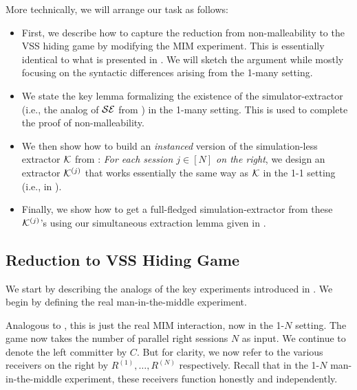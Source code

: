 More technically, we will arrange our task as follows:
\begin{itemize}
\item First, we describe how to capture the reduction from non-malleability to the VSS hiding game  by modifying the MIM experiment. This is essentially identical to what is presented in . We will sketch the argument while mostly focusing on the syntactic differences arising from the 1-many setting. 
\item 
We state the key lemma formalizing the existence of the simulator-extractor (i.e., the analog of $\mathcal{SE}$ from ) in the 1-many setting. This is used to complete the proof of non-malleability. 
\item 
We then show how to build an {\em instanced} version of the simulation-less extractor $\mathcal{K}$ from : {\em  For each session $j \in [N]$ on the right}, we design an extractor $\mathcal{K}^{(j)}$ that works essentially the same way as $\mathcal{K}$ in the 1-1 setting (i.e., in ). 
\item 
Finally, we show how to get a full-fledged simulation-extractor from these $\mathcal{K}^{(j)}$'s using our simultaneous extraction lemma given in . 
\end{itemize}  

\subsection{Reduction to VSS Hiding Game} 

We start by describing the analogs of the key experiments introduced in . We begin by defining the real man-in-the-middle experiment. 

 Analogous to , this is just the real MIM interaction, now in the 1-$N$ setting. The game now takes the number of parallel right sessions $N$ as input. We continue to denote the left committer by $C$. But for clarity, we now refer to the various receivers on the right by $R^{(1)},\dots,R^{(N)}$ respectively. Recall that in the 1-$N$ man-in-the-middle experiment, these receivers function honestly and independently. 



